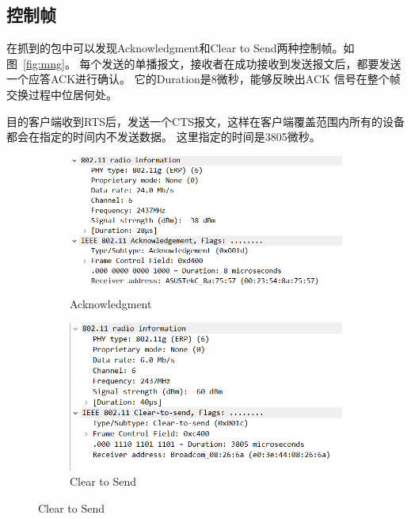 \documentclass[a4paper,twoside]{article}
\begin{document}
\begin{spacing}{1.2}
\subsection{控制帧}

在抓到的包中可以发现Acknowledgment和Clear to Send两种控制帧。如图~\ref{fig:mng}。
每个发送的单播报文，接收者在成功接收到发送报文后，都要发送一个应答ACK进行确认。
它的Duration是8微秒，能够反映出ACK 信号在整个帧交换过程中位居何处。

目的客户端收到RTS后，发送一个CTS报文，这样在客户端覆盖范围内所有的设备都会在指定的时间内不发送数据。
这里指定的时间是3805微秒。

\begin{figure}[H]
	\centering
	\caption{控制帧}
	\label{fig:mng}
	\begin{subfigure}{0.4\textwidth}
		\centering
		\includegraphics[width=\textwidth]{ack.png}
		\caption{Acknowledgment}
		\label{fig:ack}
	\end{subfigure}
	\begin{subfigure}{0.4\textwidth}
		\centering
		\includegraphics[width=\textwidth]{cts.png}
		\caption{Clear to Send}
		\label{fig:cts}
	\end{subfigure}
\end{figure}



\end{spacing}
\end{document}
